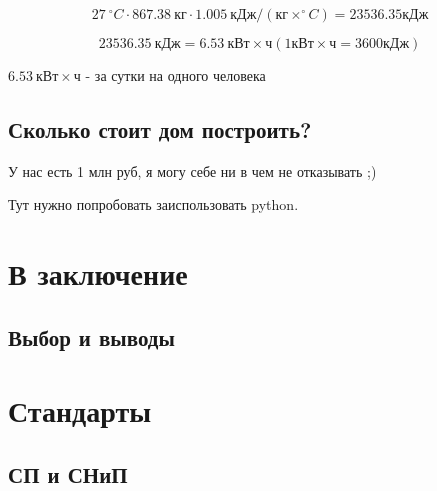 \documentclass[10pt, twocolumn]{report}
\begin{document}
$$27\ ^{\circ}C \cdot 867.38\ \text{кг} \cdot 1.005\ \text{кДж}/(\text{кг}\times^{\circ}C) = 23536.35 \text{кДж}$$

$$23536.35\ \text{кДж} = 6.53\ \text{кВт}\times\text{ч} (1 \text{кВт}\times\text{ч} = 3600 \text{кДж})$$ 

$6.53\ \text{кВт}\times\text{ч}$ - за сутки на одного человека


\chapter{Сколько стоит дом построить?}
У нас есть 1 млн руб, я могу себе ни в чем не отказывать ;)

Тут нужно попробовать заиспользовать python.


\part{В заключение}

\chapter{Выбор и выводы}

\part{Стандарты}

\chapter{СП и СНиП}
\end{document}
